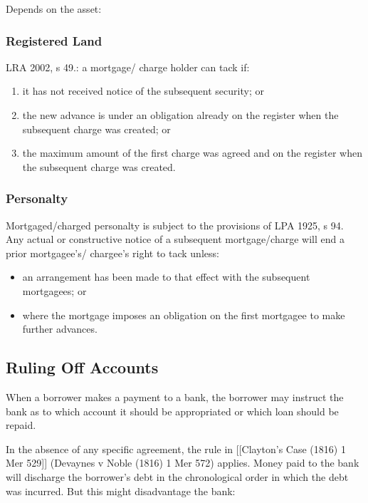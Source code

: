 \documentclass[
]{article}
\providecommand{\tightlist}{%
  \setlength{\itemsep}{0pt}\setlength{\parskip}{0pt}}
\begin{document}
Depends on the asset:

\hypertarget{registered-land}{%
\subsubsection{Registered Land}\label{registered-land}}

LRA 2002, s 49.: a mortgage/ charge holder can tack if:

\begin{enumerate}
\def\labelenumi{\arabic{enumi}.}
\tightlist
\item
  it has not received notice of the subsequent security; or
\item
  the new advance is under an obligation already on the register when
  the subsequent charge was created; or
\item
  the maximum amount of the first charge was agreed and on the register
  when the subsequent charge was created.
\end{enumerate}

\hypertarget{personalty}{%
\subsubsection{Personalty}\label{personalty}}

Mortgaged/charged personalty is subject to the provisions of LPA 1925, s
94. Any actual or constructive notice of a subsequent mortgage/charge
will end a prior mortgagee's/ chargee's right to tack unless:

\begin{itemize}
\tightlist
\item
  an arrangement has been made to that effect with the subsequent
  mortgagees; or
\item
  where the mortgage imposes an obligation on the first mortgagee to
  make further advances.
\end{itemize}

\hypertarget{ruling-off-accounts}{%
\subsection{Ruling Off Accounts}\label{ruling-off-accounts}}

When a borrower makes a payment to a bank, the borrower may instruct the
bank as to which account it should be appropriated or which loan should
be repaid.

In the absence of any specific agreement, the rule in {[}{[}Clayton's
Case (1816) 1 Mer 529{]}{]} (Devaynes v Noble (1816) 1 Mer 572) applies.
Money paid to the bank will discharge the borrower's debt in the
chronological order in which the debt was incurred. But this might
disadvantage the bank:
\end{document}
